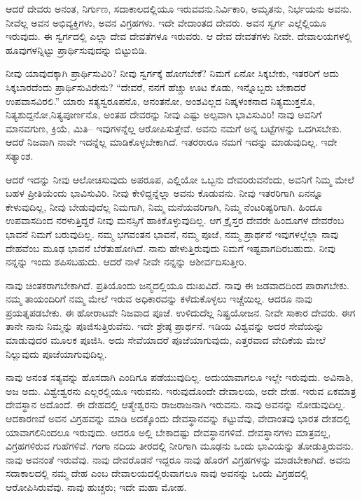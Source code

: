 ಆದರೆ ದೇವರು ಅನಂತ, ನಿರ್ಗುಣ, ಸದಾಕಾಲದಲ್ಲಿಯೂ ಇರುವವನು.\break ನಿರ್ವಿಕಾರಿ, ಅಮೃತನು, ನಿರ್ಭಯನು ಅವನು. ನೀವೆಲ್ಲ ಅವನ ಅಭಿವ್ಯಕ್ತಿಗಳು, ಅವನ ವಿಗ್ರಹಗಳು. ಇದೇ ವೇದಾಂತದ ದೇವರು. ಅವನ ಸ್ವರ್ಗ ಎಲ್ಲೆಲ್ಲಿಯೂ ಇರುವುದು. ಈ ಸ್ವರ್ಗದಲ್ಲಿ ಎಲ್ಲಾ ದೇವ ದೇವತೆಗಳೂ ಇರುವರು. ಆ ದೇವ ದೇವತೆಗಳು ನೀವೇ. ದೇವಾಲಯಗಳಲ್ಲಿ ಹೂವುಗಳನ್ನಿಟ್ಟು ಪ್ರಾರ್ಥಿಸುವುದನ್ನು ಬಿಟ್ಟುಬಿಡಿ.

ನೀವು ಯಾವುದಕ್ಕಾಗಿ ಪ್ರಾರ್ಥಿಸುವಿರಿ? ನೀವು ಸ್ವರ್ಗಕ್ಕೆ ಹೋಗಬೇಕೆ? ನಿಮಗೆ ಏನೋ ಸಿಕ್ಕಬೇಕು, ಇತರರಿಗೆ ಅದು ಸಿಕ್ಕಬಾರದೆಂದು ಪ್ರಾರ್ಥಿಸುವಿರೇನು? “ದೇವರೆ, ನನಗೆ ಹೆಚ್ಚು ಊಟ ಕೊಡು, ಇನ್ನೊಬ್ಬರು ಬೇಕಾದರೆ ಉಪವಾಸವಿರಲಿ.'' ಯಾರು ಸತ್ಯಸ್ವರೂಪನೊ, ಅನಂತನೋ, ಅಂಶವಿಲ್ಲದ ನಿಷ್ಕಳಂಕನಾದ ನಿತ್ಯಮುಕ್ತನೊ, ನಿತ್ಯಶುದ್ದನೋ,\break ನಿತ್ಯಪೂರ್ಣನೊ, ಅಂತಹ ದೇವರನ್ನು ನೀವು ಎಷ್ಟು ಅಲ್ಪವಾಗಿ ಭಾವಿಸುವಿರಿ! ನಾವು ಅವನಿಗೆ ಮಾನವಗುಣ, ಕ್ರಿಯೆ, ಮಿತಿ– ಇವುಗಳನ್ನೆಲ್ಲ ಆರೋಪಿಸುತ್ತೇವೆ. ಅವನು ನಮಗೆ ಅನ್ನ ಬಟ್ಟೆಗಳನ್ನು ಒದಗಿಸಬೇಕು. ಆದರೆ ನಿಜವಾಗಿ ನಾವೇ ಇದನ್ನೆಲ್ಲ ಮಾಡಿಕೊಳ್ಳಬೇಕಾಗಿದೆ. ಇತರರಾರೂ ನಮಗೆ ಇದನ್ನು ಮಾಡುವುದಿಲ್ಲ. ಇದೇ ಸತ್ಯಾಂಶ.

ಆದರೆ ಇದನ್ನು ನೀವು ಆಲೋಚಿಸುವುದು ಅಪರೂಪ, ಎಲ್ಲಿಯೋ ಒಬ್ಬನು ದೇವರಿರುವನೆಂದು, ಅವನಿಗೆ ನಿಮ್ಮ ಮೇಲೆ ಬಹಳ ಪ್ರೀತಿಯೆಂದು ಭಾವಿಸುವಿರಿ. ನೀವು ಕೇಳಿದ್ದನ್ನೆಲ್ಲಾ ಅವನು ಕೊಡುವನು. ನೀವು ಇತರರಿಗಾಗಿ ಏನನ್ನೂ ಕೇಳುವುದಿಲ್ಲ, ನೀವು ಬೇಡುವುದೆಲ್ಲ ನಿಮಗಾಗಿ, ನಿಮ್ಮ ಮನೆಯವರಿಗಾಗಿ, ನಿಮ್ಮ ನೆಂಟರಿಷ್ಟರಿಗಾಗಿ. ಹಿಂದೂ ಉಪವಾಸದಿಂದ ನರಳುತ್ತಿದ್ದರೆ ನೀವು ಮನಸ್ಸಿಗೆ ಹಾಕಿಕೊಳ್ಳುವುದಿಲ್ಲ. ಆಗ ಕ್ರೈಸ್ತರ ದೇವರೇ ಹಿಂದೂಗಳ ದೇವರೆಂಬ ಭಾವನೆ ನಿಮಗೆ ಬರುವುದಿಲ್ಲ. ನಮ್ಮ ಭಗವಂತನ ಭಾವನೆ, ನಮ್ಮ ಪೂಜೆ, ನಮ್ಮ ಪ್ರಾರ್ಥನೆ ಇವುಗಳಲ್ಲೆಲ್ಲಾ ನಾವು ದೇಹವೆಂಬ ಮೂಢ ಭಾವನೆ ಬೆರೆತುಹೋಗಿದೆ. ನಾನು ಹೇಳುತ್ತಿರುವುದು ನಿಮಗೆ ಇಷ್ಟವಾಗದಿರಬಹುದು. ನೀವು ನನ್ನನ್ನು ಇಂದು ಶಪಿಸಬಹುದು. ಆದರೆ ನಾಳೆ ನೀವೇ ನನ್ನನ್ನು ಆಶೀರ್ವದಿಸುತ್ತೀರಿ.

ನಾವು ಚಿಂತಕರಾಗಬೇಕಾಗಿದೆ. ಪ್ರತಿಯೊಂದು ಜನ್ಮದಲ್ಲಿಯೂ ದುಃಖವಿದೆ. ನಾವು ಈ ಜಡವಾದದಿಂದ ಪಾರಾಗಬೇಕು. ನಮ್ಮ ತಾಯಂದಿರಿಗೆ ನಮ್ಮ ಮೇಲೆ ಇರುವ ಅಧಿಕಾರವನ್ನು ಕಳೆದುಕೊಳ್ಳಲು ಇಚ್ಚೆಯಿಲ್ಲ. ಆದರೂ ನಾವು ಪ್ರಯತ್ನಪಡಬೇಕು. ಈ ಹೋರಾಟವೇ ನಿಜವಾದ ಪೂಜೆ. ಉಳಿದುದೆಲ್ಲ ನಿಷ್ಪ್ರಯೋಜನ. ನೀವೇ ಸಾಕಾರ ದೇವರು. ಈಗ ತಾನೇ ನಾನು ನಿಮ್ಮನ್ನು ಪೂಜಿಸುತ್ತಿರುವೆನು. ಇದೇ ಶ್ರೇಷ್ಠ ಪ್ರಾರ್ಥನೆ. ಇಡಿಯ ವಿಶ್ವವನ್ನು ಅದರ ಸೇವೆಯನ್ನು ಮಾಡುವುದರ ಮೂಲಕ ಪೂಜಿಸಿ. ಅದು ಸೇವೆಯಾದರೆ ಪೂಜೆಯಾಗುವುದು, ಎತ್ತರವಾದ ವೇದಿಕೆಯ ಮೇಲೆ ನಿಲ್ಲುವುದು ಪೂಜೆಯಾಗುವುದಿಲ್ಲ.

ನಾವು ಅನಂತ ಸತ್ಯವನ್ನು ಹೊಸದಾಗಿ ಎಂದಿಗೂ ಪಡೆಯುವುದಿಲ್ಲ. ಅದು\break ಯಾವಾಗಲೂ ಇಲ್ಲೇ ಇರುವುದು. ಅವಿನಾಶಿ, ಅಜ ಅದು. ವಿಶ್ವೇಶ್ವರನು ಎಲ್ಲರಲ್ಲಿಯೂ ಇರುವನು. ಇರುವುದೊಂದೇ ದೇವಾಲಯ, ಅದೇ ದೇಹ. ಇರುವ ಏಕಮಾತ್ರ ದೇವಸ್ಥಾನ ಅದೊಂದೆ. ಈ ದೇಹದಲ್ಲಿ ಆತ್ಮೇಶ್ವರನು ರಾಜರಾಜನಾಗಿ ಇರುವನು. ನಾವು ಅವನನ್ನು ನೋಡುವುದಿಲ್ಲ. ಆದಕಾರಣವೆ ಅವನ ವಿಗ್ರಹವನ್ನು ಮಾಡಿ ಅದಕ್ಕೊಂದು ದೇವಸ್ಥಾನವನ್ನು ಕಟ್ಟುವೆವು, ವೇದಾಂತವು ಭಾರತ ದೇಶದಲ್ಲಿ ಯಾವಾಗಲಿನಿಂದಲೂ ಇರುವುದು. ಆದರೂ ಅಲ್ಲಿ ಬೇಕಾದಷ್ಟು ದೇವಸ್ಥಾನಗಳಿವೆ. ದೇವಸ್ಥಾನಗಳು ಮಾತ್ರವಲ್ಲ, ವಿಗ್ರಹಗಳಿರುವ ಗುಹೆಗಳಿವೆ. ಗಂಗಾ ನದಿಯ ತೀರದಲ್ಲಿ ನೀರಿಗಾಗಿ ಮೂಢನು ಒಂದು ಭಾವಿಯನ್ನು ತೋಡುತ್ತಿರುವನು. ನಾವು ಅವನಂತೆ ಇರುವೆವು. ನಾವು ದೇವರೊಡನೆ ಇದ್ದರೂ ನಾವು ಹೊರಗೆ ವಿಗ್ರಹಗಳನ್ನು ಮಾಡಬೇಕಾಗಿದೆ. ಅವನು ಸದಾಕಾಲದಲ್ಲಿ ನಮ್ಮ ದೇಹ ಎಂಬ ದೇವಾಲಯದಲ್ಲಿರುವಾಗಲೂ ನಾವು ಅವನನ್ನು ಒಂದು ವಿಗ್ರಹದಲ್ಲಿ ಆರೋಪಿಸಿರುವೆವು. ನಾವು ಹುಚ್ಚರು; ಇದೇ ಮಹಾ ಮೋಹ.

